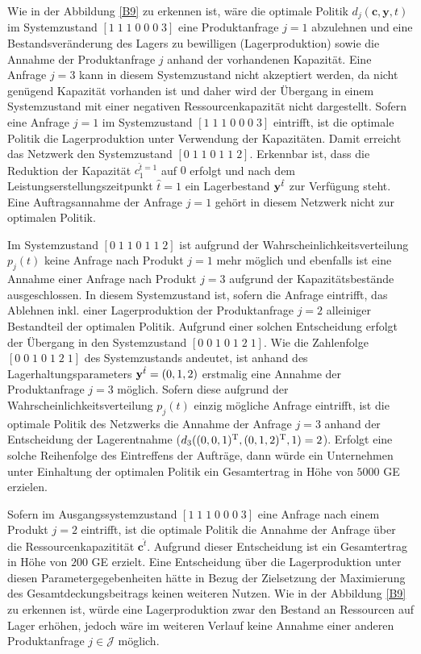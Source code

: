 Wie in der Abbildung \ref{B9} zu erkennen ist, wäre die optimale Politik $d_{j}({\textbf{c},\textbf{y}, t})$ im Systemzustand $[1\;1\;1\;0\;0\;0\;3]$ eine Produktanfrage $j=1$ abzulehnen und eine Bestandsveränderung des Lagers zu bewilligen (Lagerproduktion) sowie die Annahme der Produktanfrage $j$ anhand der vorhandenen Kapazität. Eine Anfrage $j=3$ kann in diesem Systemzustand nicht akzeptiert werden, da nicht genügend Kapazität vorhanden ist und daher wird der Übergang in einem Systemzustand mit einer negativen Ressourcenkapazität nicht dargestellt. Sofern eine Anfrage $j=1$ im Systemzustand $[1\;1\;1\;0\;0\;0\;3]$ eintrifft, ist die optimale Politik die Lagerproduktion unter Verwendung der Kapazitäten. Damit erreicht das Netzwerk den Systemzustand $[0\;1\;1\;0\;1\;1\;2]$. Erkennbar ist, dass die Reduktion der Kapazität $c_1^{\hat t=1}$ auf $0$ erfolgt und nach dem Leistungserstellungszeitpunkt $\hat t = 1$ ein Lagerbestand $\textbf y^{\hat t}$ zur Verfügung steht. Eine Auftragsannahme der Anfrage $j=1$ gehört in diesem Netzwerk nicht zur optimalen Politik.

Im Systemzustand $[0\;1\;1\;0\;1\;1\;2]$ ist aufgrund der Wahrscheinlichkeitsverteilung $p_j(t)$ keine Anfrage nach Produkt $j=1$ mehr möglich und ebenfalls ist eine Annahme einer Anfrage nach Produkt $j=3$ aufgrund der Kapazitätsbestände ausgeschlossen. In diesem Systemzustand ist, sofern die Anfrage eintrifft, das Ablehnen inkl. einer Lagerproduktion der Produktanfrage $j=2$ alleiniger Bestandteil der optimalen Politik. Aufgrund einer solchen Entscheidung erfolgt der Übergang in den Systemzustand $[0\;0\;1\;0\;1\;2\;1]$. Wie die Zahlenfolge $[0\;0\;1\;0\;1\;2\;1]$ des Systemzustands andeutet, ist anhand des Lagerhaltungsparameters $\textbf y^{\hat t}=(0,1,2)$ erstmalig eine Annahme der Produktanfrage $j=3$ möglich. Sofern diese aufgrund der Wahrscheinlichkeitsverteilung $p_j(t)$ einzig mögliche Anfrage eintrifft, ist die optimale Politik des Netzwerks die Annahme der Anfrage $j=3$ anhand der Entscheidung der Lagerentnahme ($d_{3}((0,0,1)^{\textnormal T},(0,1,2)^{\textnormal T}, 1)=2$). Erfolgt eine solche Reihenfolge des Eintreffens der Aufträge, dann würde ein Unternehmen unter Einhaltung der optimalen Politik ein Gesamtertrag in Höhe von $5000$ GE erzielen.

Sofern im Ausgangssystemzustand $[1\;1\;1\;0\;0\;0\;3]$ eine Anfrage nach einem Produkt $j=2$ eintrifft, ist die optimale Politik die Annahme der Anfrage über die Ressourcenkapazitität $\textbf{c}^{\hat t}$. Aufgrund dieser Entscheidung ist ein Gesamtertrag in Höhe von $200$ GE erzielt. Eine Entscheidung über die Lagerproduktion unter diesen Parametergegebenheiten hätte in Bezug der Zielsetzung der Maximierung des Gesamtdeckungsbeitrags keinen weiteren Nutzen. Wie in der Abbildung \ref{B9} zu erkennen ist, würde eine Lagerproduktion zwar den Bestand an Ressourcen auf Lager erhöhen, jedoch wäre im weiteren Verlauf keine Annahme einer anderen Produktanfrage $j\in\mathcal J$ möglich. %

